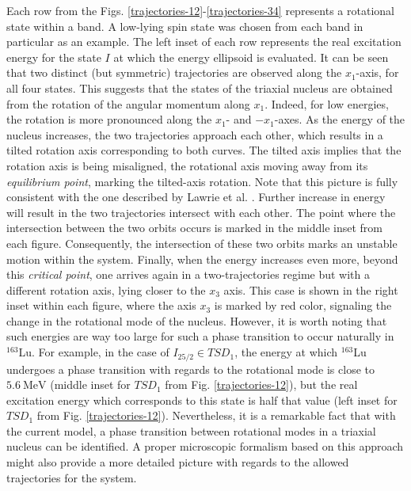 \documentclass[myclassdoc,debug]{rjparticle}
\begin{document}
Each row from the Figs. \ref{trajectories-12}-\ref{trajectories-34} represents a rotational state within a band. A low-lying spin state was chosen from each band in particular as an example. The left inset of each row represents the real excitation energy for the state $I$ at which the energy ellipsoid is evaluated. It can be seen that two distinct (but symmetric) trajectories are observed along the $x_1$-axis, for all four states. This suggests that the states of the triaxial nucleus are obtained from the rotation of the angular momentum along $x_1$. Indeed, for low energies, the rotation is more pronounced along the $x_1$- and $-x_1$-axes. As the energy of the nucleus increases, the two trajectories approach each other, which results in a tilted rotation axis corresponding to both curves. The tilted axis implies that the rotation axis is being misaligned, the rotational axis moving away from its \emph{equilibrium point}, marking the tilted-axis rotation. Note that this picture is fully consistent with the one described by Lawrie et al. \cite{lawrie2020tilted}. Further increase in energy will result in the two trajectories intersect with each other. The point where the intersection between the two orbits occurs is marked in the middle inset from each figure. Consequently, the intersection of these two orbits marks an unstable motion within the system. Finally, when the energy increases even more, beyond this \emph{critical point}, one arrives again in a two-trajectories regime but with a different rotation axis, lying closer to the $x_3$ axis. This case is shown in the right inset within each figure, where the axis $x_3$ is marked by red color, signaling the change in the rotational mode of the nucleus. However, it is worth noting that such energies are way too large for such a phase transition to occur naturally in $^{163}$Lu. For example, in the case of $I_{25/2}\in TSD_1$, the energy at which $^{163}$Lu undergoes a phase transition with regards to the rotational mode is close to $5.6\ \text{MeV}$ (middle inset for $TSD_1$ from Fig. \ref{trajectories-12}), but the real excitation energy which corresponds to this state is half that value (left inset for $TSD_1$ from Fig. \ref{trajectories-12}). Nevertheless, it is a remarkable fact that with the current model, a phase transition between rotational modes in a triaxial nucleus can be identified. A proper microscopic formalism based on this approach might also provide a more detailed picture with regards to the allowed trajectories for the system.
\end{document}
